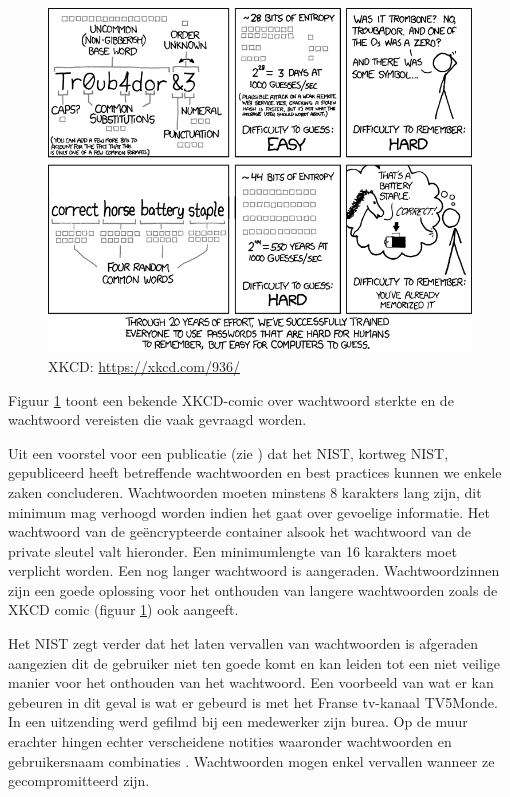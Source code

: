 \begin{figure}[H]
	\includegraphics[width=\textwidth,keepaspectratio]{img/password-strength-xkcd.png}
	\centering
	\caption{XKCD: \url{https://xkcd.com/936/}}
	\label{fig:wachtwoord-sterkte-xkcd}
\end{figure}

Figuur \ref{fig:wachtwoord-sterkte-xkcd} toont een bekende XKCD-comic over
wachtwoord sterkte en de wachtwoord vereisten die vaak gevraagd worden.

Uit een voorstel voor een publicatie (zie
\textcite{NISTDigitalIdentityGuidelines}) dat het \acrlong{NIST}, kortweg
\acrshort{NIST}, gepubliceerd heeft betreffende
wachtwoorden en best practices kunnen we enkele zaken concluderen. Wachtwoorden
moeten minstens 8 karakters lang zijn, dit minimum mag verhoogd worden indien
het gaat over gevoelige informatie. Het wachtwoord van de geëncrypteerde
container alsook het wachtwoord van de private sleutel valt hieronder. Een
minimumlengte van 16 karakters moet verplicht worden. Een nog langer wachtwoord
is aangeraden. Wachtwoordzinnen zijn een goede oplossing voor het onthouden van
langere wachtwoorden zoals de XKCD comic (figuur
\ref{fig:wachtwoord-sterkte-xkcd}) ook aangeeft.

Het \acrshort{NIST} zegt verder dat het laten vervallen van wachtwoorden is
afgeraden
aangezien dit de gebruiker niet ten goede komt en kan leiden tot een niet
veilige manier voor het onthouden van het wachtwoord. Een voorbeeld van wat er
kan gebeuren in dit geval is wat er gebeurd is met het Franse tv-kanaal
TV5Monde. In een uitzending werd gefilmd bij een medewerker zijn burea. Op de
muur erachter hingen echter verscheidene notities waaronder wachtwoorden en
gebruikersnaam combinaties \autocite{MachkovechMonde}. Wachtwoorden mogen enkel
vervallen wanneer ze gecompromitteerd zijn.

